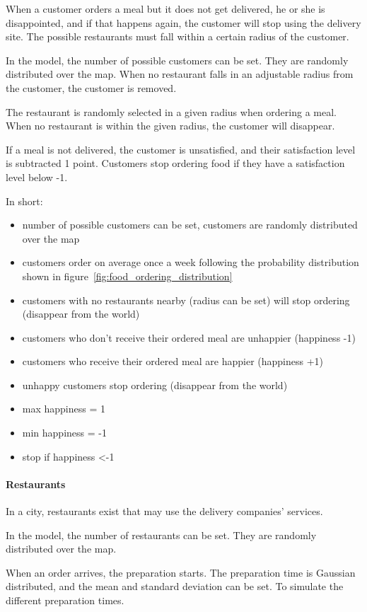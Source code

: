 When a customer orders a meal but it does not get delivered, he or she is disappointed, and if that happens again, the customer will stop using the delivery site.
The possible restaurants must fall within a certain radius of the customer.

In the model, the number of possible customers can be set.
They are randomly distributed over the map.
When no restaurant falls in an adjustable radius from the customer, the customer is removed.

The restaurant is randomly selected in a given radius when ordering a meal.
When no restaurant is within the given radius, the customer will disappear.

If a meal is not delivered, the customer is unsatisfied, and their satisfaction level is subtracted 1 point.
Customers stop ordering food if they have a satisfaction level below -1.

In short:
\begin{itemize}
\item number of possible customers can be set, customers are randomly distributed over the map
\item customers order on average once a week following the probability distribution shown in figure~\ref{fig:food_ordering_distribution}
\item customers with no restaurants nearby (radius can be set) will stop ordering (disappear from the world)
\item customers who don't receive their ordered meal are unhappier (happiness -1)
\item customers who receive their ordered meal are happier (happiness +1)
\item unhappy customers stop ordering (disappear from the world)
\item max happiness = 1
\item min happiness = -1
\item stop if happiness \textless -1
\end{itemize}

\paragraph{Restaurants}
In a city, restaurants exist that may use the delivery companies' services.

In the model, the number of restaurants can be set.
They are randomly distributed over the map.

When an order arrives, the preparation starts.
The preparation time is Gaussian distributed, and the mean and standard deviation can be set.
To simulate the different preparation times.

